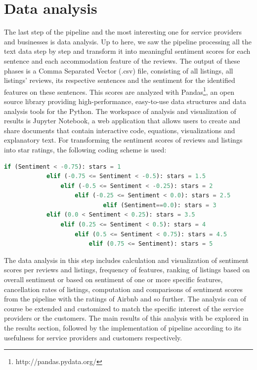 \section{Data analysis}
% 
%
The last step of the pipeline and the most interesting one for service providers and businesses is data analysis. Up to here, we saw the pipeline processing all the text data step by step and transform it into meaningful sentiment scores for each sentence and each accommodation feature of the reviews. The output of these phases is a Comma Separated Vector (.csv) file, consisting of all listings, all listings' reviews, its respective sentences and the sentiment for the identified features on these sentences. This scores are analyzed with Pandas\footnote{http://pandas.pydata.org/}, an open source library providing high-performance, easy-to-use data structures and data analysis tools for the Python. The workspace  of analysis and visualization of results is Jupyter Notebook, a web application that allows users to create and share documents that contain  interactive code, equations, visualizations and explanatory text. For transforming the sentiment scores of reviews and listings into star ratings, the following coding scheme is used:

\tiny
\begin{lstlisting}[language=python]
	if (Sentiment < -0.75):	stars = 1
  			elif (-0.75 <= Sentiment < -0.5): stars = 1.5
    			elif (-0.5 <= Sentiment < -0.25): stars = 2
    				elif (-0.25 <= Sentiment < 0.0): stars = 2.5
            				elif (Sentiment==0.0): stars = 3
    		elif (0.0 < Sentiment < 0.25): stars = 3.5
    			elif (0.25 <= Sentiment < 0.5): stars = 4
    				elif (0.5 <= Sentiment < 0.75): stars = 4.5
    					elif (0.75 <= Sentiment): stars = 5
\end{lstlisting}
\normalsize
The data  analysis in this step includes calculation and visualization of sentiment scores per reviews and listings, frequency of features, ranking of listings based on overall sentiment or based on sentiment of one or more specific features, cancellation rates of listings, computation and comparisons of sentiment scores from the pipeline with the ratings of Airbnb and so further. The analysis can of course be extended and customized to match the specific interest of the service providers or the customers. The main results of this analysis with be explored in the results section, followed by the implementation of pipeline according to its usefulness for service providers and customers respectively. 